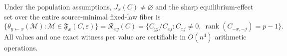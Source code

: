 Under the population assumptions, \(J_x(C)\ne\varnothing\) and the sharp equilibrium-effect set over the entire source-minimal fixed-law fiber is \[\{\theta_{y\leftarrow x}(\mathcal M):\mathcal M\in\mathfrak F_x(C,\varepsilon)\}=\mathcal R_{xy}(C)=\{C_{yj}/C_{xj}:C_{xj}\ne0,\ \operatorname{rank}(C_{-x,-j})=p-1\}.\] All values and one exact witness per value are certifiable in \(O(n^4)\) arithmetic operations.